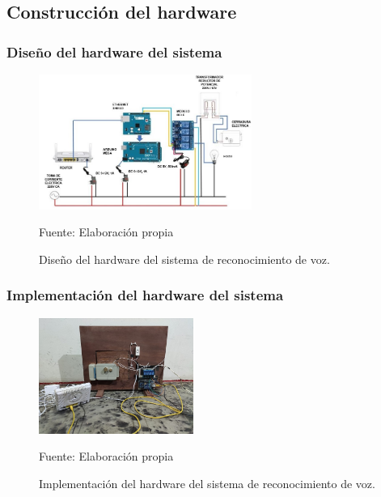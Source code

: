 \newpage
\subsection{Construcción del hardware}
\subsubsection{Diseño del hardware del sistema}
\begin{figure}[H]
\captionsetup{justification=centering}
\begin{center}
\includegraphics[width=0.62\textwidth]{Imagenes/Cap3/image069}
\end{center}
\begin{center}
\vskip -0.5cm
\caption{\small{Diseño del hardware del sistema de reconocimiento de voz.}}
\label{fig:figura3.69}
{\small{Fuente: Elaboración propia}}
\end{center}
\end{figure}

\subsubsection{Implementación del hardware del sistema}
\begin{figure}[H]
\captionsetup{justification=centering}
\begin{center}
\includegraphics[width=0.45\textwidth]{Imagenes/Cap3/image070}
\end{center}
\begin{center}
\vskip -0.5cm
\caption{\small{Implementación del hardware del sistema de reconocimiento de voz.}}
\label{fig:figura3.70}
{\small{Fuente: Elaboración propia}}
\end{center}
\end{figure}

